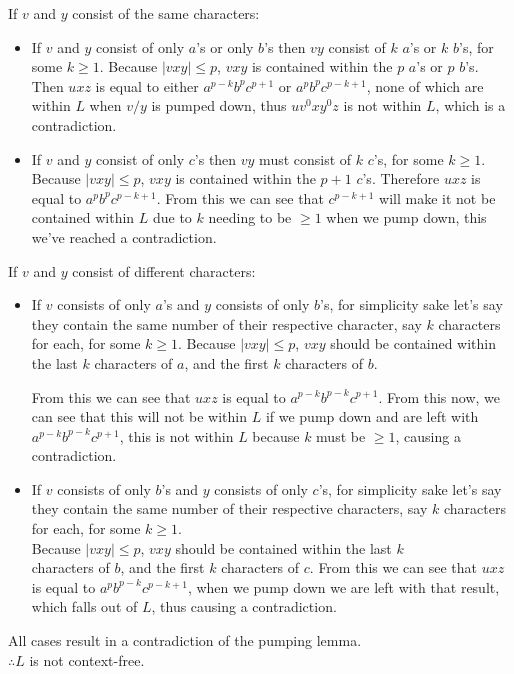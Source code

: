 \documentclass[11pt]{article}
\begin{document}
\vspace{7px}If $v$ and $y$ consist of the same characters:
\begin{itemize}
\item
If $v$ and $y$ consist of only $a$'s or only $b$'s then $vy$ consist of $k$ $a$'s or
$k$ $b$'s, for some $k\ge 1$. Because $|vxy|\le p$, $vxy$ is contained within the
$p$ $a$'s or $p$ $b$'s. Then $uxz$ is equal to either $a^{p-k}b^pc^{p+1}$ or 
$a^pb^pc^{p-k+1}$, none of which are within $L$ when $v/y$ is pumped down,
thus $uv^0xy^0z$ is not within $L$, which is a contradiction.

\item 
If $v$ and $y$ consist of only $c$'s then $vy$ must consist of $k$ $c$'s, for some 
$k\ge 1$. Because $|vxy|\le p$, $vxy$ is contained within the $p+1$ $c$'s. Therefore
$uxz$ is equal to $a^pb^pc^{p-k+1}$. From this we can see that $c^{p-k+1}$ will
make it not be contained within $L$ due to $k$ needing to be $\ge 1$ when we
pump down, this we've reached a contradiction.
\end{itemize}

\vspace{7px}If $v$ and $y$ consist of different characters:
\begin{itemize}
\item 
If $v$ consists of only $a$'s and $y$ consists of only $b$'s, for simplicity sake let's
say they contain the same number of their respective character, say $k$ characters
for each, for some $k\ge 1$. Because $|vxy|\le p$, $vxy$ should be contained within
the last $k$ characters of $a$, and the first $k$ characters of $b$.

From this we can see that $uxz$ is equal to $a^{p-k}b^{p-k}c^{p+1}$. From this now,
we can see that this will not be within $L$ if we pump down and are left with
$a^{p-k}b^{p-k}c^{p+1}$, this is not within $L$ because $k$ must be $\ge 1$,
causing a contradiction.

\item
If $v$ consists of only $b$'s and $y$ consists of only $c$'s, for simplicity sake let's
say they contain the same number of their respective characters, say $k$ characters
for each, for some $k\ge 1$. \\Because $|vxy|\le p$, $vxy$ should be contained within
the last $k$ \\characters of $b$, and the first $k$ characters of $c.$ From this
we can see that $uxz$ is equal to $a^pb^{p-k}c^{p-k+1}$, when we pump down we are
left with that result, which falls out of $L$, thus causing a contradiction.
\end{itemize}
All cases result in a contradiction of the pumping lemma.\\
$\therefore L$ is not context-free.
\end{document}
